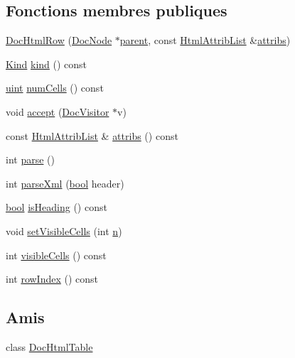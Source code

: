 \subsection*{Fonctions membres publiques}
\begin{DoxyCompactItemize}
\item 
\hyperlink{class_doc_html_row_a7da5a9ce865c561c0aa9c8378ac91d83}{Doc\+Html\+Row} (\hyperlink{class_doc_node}{Doc\+Node} $\ast$\hyperlink{class_doc_node_a990d8b983962776a647e6231d38bd329}{parent}, const \hyperlink{class_html_attrib_list}{Html\+Attrib\+List} \&\hyperlink{class_doc_html_row_a5fb9c34a0e9013a5fd55a5e7f5e50f60}{attribs})
\item 
\hyperlink{class_doc_node_aebd16e89ca590d84cbd40543ea5faadb}{Kind} \hyperlink{class_doc_html_row_a7a03b3b7b19800deb159ed949dd87603}{kind} () const 
\item 
\hyperlink{qglobal_8h_a4d3943ddea65db7163a58e6c7e8df95a}{uint} \hyperlink{class_doc_html_row_a5f28cb286346471bad2e37322a21fbef}{num\+Cells} () const 
\item 
void \hyperlink{class_doc_html_row_a1b62250676fc8c1223c94fbc61beeb0e}{accept} (\hyperlink{class_doc_visitor}{Doc\+Visitor} $\ast$v)
\item 
const \hyperlink{class_html_attrib_list}{Html\+Attrib\+List} \& \hyperlink{class_doc_html_row_a5fb9c34a0e9013a5fd55a5e7f5e50f60}{attribs} () const 
\item 
int \hyperlink{class_doc_html_row_ad3a01dad6a2318647d5eb3e8d3d4ac90}{parse} ()
\item 
int \hyperlink{class_doc_html_row_ae3b8511bd72b445cdf33c2e0b8ea58e7}{parse\+Xml} (\hyperlink{qglobal_8h_a1062901a7428fdd9c7f180f5e01ea056}{bool} header)
\item 
\hyperlink{qglobal_8h_a1062901a7428fdd9c7f180f5e01ea056}{bool} \hyperlink{class_doc_html_row_accbfb59186495c223f5ffe27f8874aeb}{is\+Heading} () const 
\item 
void \hyperlink{class_doc_html_row_a9bba32b3b39b4dafdf607acb6aac1514}{set\+Visible\+Cells} (int \hyperlink{060__command__switch_8tcl_acdde3cd86eb2421ce8dbb2e85227d368}{n})
\item 
int \hyperlink{class_doc_html_row_af5ea0e54304adfbf2229fcd4721ad5a3}{visible\+Cells} () const 
\item 
int \hyperlink{class_doc_html_row_a401fc8383cbcba2910142d03892502fa}{row\+Index} () const 
\end{DoxyCompactItemize}
\subsection*{Amis}
\begin{DoxyCompactItemize}
\item 
class \hyperlink{class_doc_html_row_a1f7413118a8c0d90c891a2695a7cb90d}{Doc\+Html\+Table}
\end{DoxyCompactItemize}
